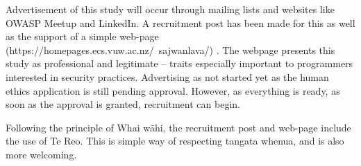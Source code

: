 \par Advertisement of this study will occur through mailing lists and websites like OWASP Meetup and LinkedIn. A recruitment post has been made for this as well as the support of a simple web-page (https://homepages.ecs.vuw.ac.nz/~sajwanlava/) \cite{webpage}. The webpage presents this study as professional and legitimate – traits especially important to programmers interested in security practices. Advertising as not started yet as the human ethics application is still pending approval. However, as everything is ready, as soon as the approval is granted, recruitment can begin. 
\newline
\par Following the principle of Whai wāhi, the recruitment post and web-page include the use of Te Reo. This is simple way of respecting tangata whenua, and is also more welcoming. 







